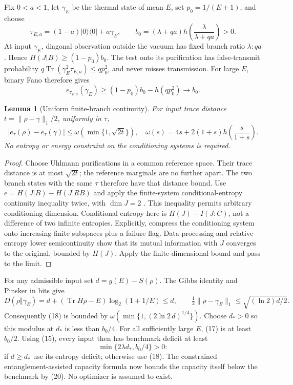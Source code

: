 \documentclass[11pt]{article}
\newtheorem{lemma}[theorem]{Lemma}
\newcommand{\Tr}{\operatorname{Tr}}
\begin{document}
Fix \(0<a<1\), let \(\gamma_E\) be the thermal state of mean \(E\), set
\(p_0=1/(E+1)\), and choose
\[
 \tau_{E,a}=(1-a)|0\rangle\langle0|+a\gamma_E,\qquad
 b_0=(\lambda+qa)h\left(\frac{\lambda}{\lambda+qa}\right)>0.     \tag{16}
\]
At input \(\gamma_E\), diagonal observation outside the vacuum has fixed
branch ratio \(\lambda:qa\). Hence \(H(J|B)\ge(1-p_0)b_0\).
The test onto its purification has false-transmit probability
\(q\Tr(\gamma_E^2\tau_{E,a})\le qp_0^2\), and never misses transmission.
For large \(E\), binary Fano therefore gives
\[
 e_{\tau_{E,a}}(\gamma_E)\ge(1-p_0)b_0-h(qp_0^2)
                          \longrightarrow b_0.               \tag{17}
\]

\begin{lemma}[Uniform finite-branch continuity]\label{lem:continuity}
For input trace distance \(t=\|\rho-\gamma\|_1/2\), uniformly in \(\tau\),
\[
 |e_\tau(\rho)-e_\tau(\gamma)|\le
 \omega(\min\{1,\sqrt{2t}\}),\quad
 \omega(s)=4s+2(1+s)h\left(\frac{s}{1+s}\right).                \tag{18}
\]
No entropy or energy constraint on the conditioning systems is required.
\end{lemma}
\begin{proof}
Choose Uhlmann purifications in a common reference space.
Their trace distance is at most \(\sqrt{2t}\); the reference marginals
are no further apart. The two branch states with the same \(\tau\)
therefore have that distance bound.
Use \(e=H(J|B)-H(J|RB)\) and apply the finite-system
conditional-entropy continuity inequality twice, with \(\dim J=2\)
\cite[Lemma 2]{winter}. This inequality permits arbitrary conditioning
dimension. Conditional entropy here is \(H(J)-I(J:C)\), not a difference
of two infinite entropies.
Explicitly, compress the conditioning system onto increasing finite
subspaces plus a failure flag. Data processing and relative-entropy
lower semicontinuity show that its mutual information with \(J\)
converges to the original, bounded by \(H(J)\).
Apply the finite-dimensional bound and pass to the limit.
\end{proof}

For any admissible input set \(d=g(E)-S(\rho)\).
The Gibbs identity and Pinsker in bits give
\[
 D(\rho\Vert\gamma_E)
 =d+(\Tr H\rho-E)\log_2(1+1/E)\le d,\qquad
 \tfrac12\|\rho-\gamma_E\|_1\le\sqrt{(\ln2)d/2}.                \tag{19}
\]
Consequently (18) is bounded by
\(\omega(\min\{1,(2\ln2\,d)^{1/4}\})\).
Choose \(d_*>0\) so this modulus at \(d_*\) is less than \(b_0/4\).
For all sufficiently large \(E\), (17) is at least \(b_0/2\).
Using (15), every input then has benchmark deficit at least
\[
 \min\{2\lambda d_*,b_0/4\}>0:                                \tag{20}
\]
if \(d\ge d_*\) use its entropy deficit; otherwise use (18).
The constrained entanglement-assisted capacity formula
\cite[Theorem 1]{hs} now bounds the capacity itself below the benchmark
by (20). No optimizer is assumed to exist.
\end{document}
